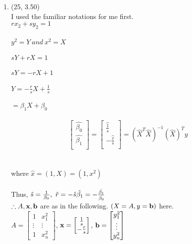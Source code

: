 \documentclass[letterpaper,12pt]{article}
\theoremstyle{definition}
\begin{document}
\begin{enumerate}
	\item (25, 3.50) \\ I used the familiar notations for me first.\\
$rx_2 + sy_2 = 1 $
\\
\\
$y^2 = Y \ and \ x^2 = X $
\\
\\
$sY + rX = 1$
\\
\\
$sY = -rX + 1 $
\\
\\
$Y = -\frac{r}{s}X + \frac{1}{s}$
\\
\\
$=\beta_1 X + \beta_0$
\\
\\
\[
\begin{bmatrix}
    \hat{\beta_0}       \\
    \hat{\beta_1}       \\
\end{bmatrix}
= 
\begin{bmatrix}
    \hat{\frac{1}{s}}    \\
    -\hat{\frac{r}{s}}     \\
\end{bmatrix}
=(\hat{X}^T\hat{X})^{-1}(\hat{X})^Ty
\]
\\
\\
where $\hat{x} = (1, X) = (1, x^2)$
\\
\\
Thus, $\hat{s} = \frac{1}{\beta_0}, \ \hat{r} = -\hat{s} \hat{\beta_1} = - \frac{\hat{\beta_1}}{\hat{\beta_0}} \\ $ \\
$\therefore  A, \bold{x}, \bold{b}$ are as in the following. $(X = A, y = \bold{b})$ here. \\
$A = \begin{bmatrix}
    1  & x_{1}^{2}  \\
    \vdots & \vdots    \\
    1 & x_{n}^{2}
\end{bmatrix}$,  $ 
\bold{x}=\begin{bmatrix}
    \frac{1}{s}    \\
    -\frac{r}{s}     \\
\end{bmatrix}$,  $
\bold{b} = \begin{bmatrix}
    y_{1}^{2}    \\
    \vdots    \\
    y_{n}^2
\end{bmatrix}$















\end{enumerate}

\vspace{25mm}


\end{document}
